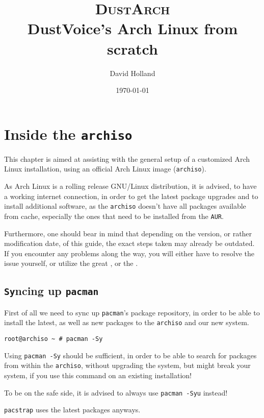 \documentclass[10pt]{dustdoc}
\title{\texorpdfstring{{\scshape{\Huge DustArch}\\{\normalsize\vspace{2.5em}}}}{DustArch: }DustVoice’s Arch Linux from scratch}
\author{David Holland}
\date{\today{}}
\begin{document}
\maketitle

\tableofcontents

\chapter{Inside the \texttt{archiso}}
\label{sec:inside-the-archiso}

This chapter is aimed at assisting with the general setup of a customized Arch Linux installation, using an official Arch Linux image (\texttt{archiso}).

\begin{NOTE}
    As Arch Linux is a rolling release GNU/Linux distribution, it is advised, to have a working internet connection, in order to get the latest package upgrades and to install additional software, as the \texttt{archiso} doesn't have all packages available from cache, especially the ones that need to be installed from the \texttt{AUR}.

    Furthermore, one should bear in mind that depending on the version, or rather modification date, of this guide, the exact steps taken may already be outdated.
    If you encounter any problems along the way, you will either have to resolve the issue yourself, or utilize the great , or the .
\end{NOTE}

\section{\texttt{Sy}ncing up \texttt{pacman}}
\label{sec:syncing-up-pacman}

First of all we need to sync up \texttt{pacman}'s package repository, in order to be able to install the latest, as well as new packages to the \texttt{archiso} and our new system.

\begin{verbatim}
root@archiso ~ # pacman -Sy
\end{verbatim}

\begin{WARNING}
    Using \texttt{pacman -Sy} should be sufficient, in order to be able to search for packages from within the \texttt{archiso}, without upgrading the system, but might break your system, if you use this command on an existing installation!

    To be on the safe side, it is advised to always use \texttt{pacman -Syu} instead!

    \texttt{pacstrap} uses the latest packages anyways.
\end{WARNING}
\end{document}
